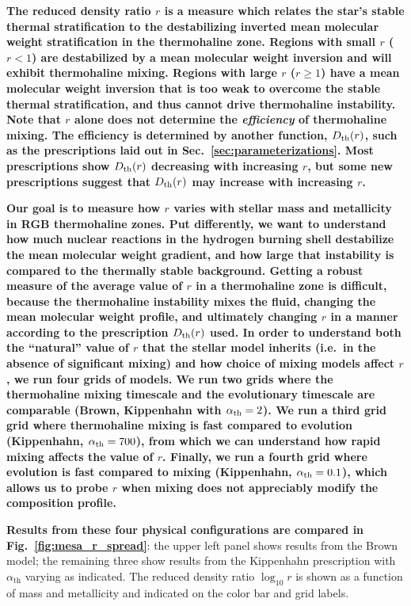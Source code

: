%
%
\textbf{The reduced density ratio $r$ is a measure which relates the star's stable thermal stratification to the destabilizing inverted mean molecular weight stratification in the thermohaline zone.
Regions with small $r$ ($r < 1$) are destabilized by a mean molecular weight inversion and will exhibit thermohaline mixing.
Regions with large $r$ ($r \geq 1$) have a mean molecular weight inversion that is too weak to overcome the stable thermal stratification, and thus cannot drive thermohaline instability.} 
\textbf{Note that $r$ alone does not determine the \emph{efficiency} of thermohaline mixing.
The efficiency is determined by another function, $D_{\rm{th}}(r)$, such as the prescriptions laid out in  Sec.~\ref{sec:parameterizations}.
Most prescriptions show $D_{\rm{th}}(r)$ decreasing with increasing $r$, but some new prescriptions \citep[e.g.,][]{harrington} suggest that $D_\mathrm{th}(r)$ may increase with increasing $r$.
}

\textbf{
Our goal is to measure how $r$ varies with stellar mass and metallicity in RGB thermohaline zones.
Put differently, we want to understand how much nuclear reactions in the hydrogen burning shell destabilize the mean molecular weight gradient, and how large that instability is compared to the thermally stable background.
Getting a robust measure of the average value of $r$ in a thermohaline zone is difficult, because the thermohaline instability mixes the fluid, changing the mean molecular weight profile, and ultimately changing $r$ in a manner according to the prescription $D_\mathrm{th}(r)$ used.
In order to understand both the ``natural'' value of $r$ that the stellar model inherits (i.e.~in the absence of significant mixing) and how choice of mixing models affect $r$, we run four grids of models.
We run two grids where the thermohaline mixing timescale and the evolutionary timescale are comparable (Brown, Kippenhahn with $\alpha_{\rm{th}} = 2$).
We run a third grid grid where thermohaline mixing is fast compared to evolution (Kippenhahn, $\alpha_{\rm th} = 700$), from which we can understand how rapid mixing affects the value of $r$.
Finally, we run a fourth grid where evolution is fast compared to mixing (Kippenhahn, $\alpha_{\rm{th}} = 0.1$), which allows us to probe $r$ when mixing does not appreciably modify the composition profile.
}

\textbf{Results from these four physical configurations are compared in Fig.~\ref{fig:mesa_r_spread}}: the upper left panel shows results from the Brown model; the remaining three show results from the Kippenhahn prescription with $\alpha_{\text{th}}$ varying as indicated. The reduced density ratio $\log_{10} r$ is shown as a function of mass and metallicity and indicated on the color bar and grid labels.
%

